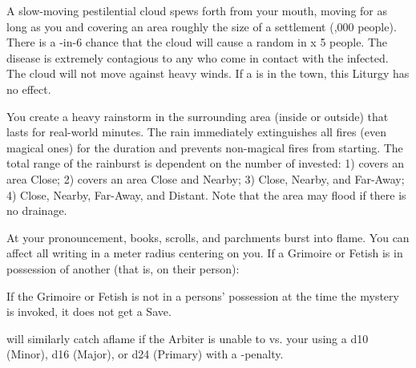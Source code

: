 \begin{multicols*}{2}
A slow-moving pestilential cloud spews forth from your mouth, moving for as long as you  and covering an area roughly the size of a  settlement (,000 people). There is a \DICE-in-6 chance that the cloud will cause a random  in \DICE x 5 people. The disease is extremely contagious to any who come in contact with the infected. The cloud will not move against heavy winds. If a  is in the town, this Liturgy has no effect.


\cbreak

\LITURGY [
  Name = Rainburst,
  Link = arcana-mystery-rainburst,
  Paradigm = Heathen,
  Duration = Session
]

You create a heavy rainstorm in the surrounding area (inside or outside) that lasts for \SUMDICE real-world minutes.  The rain immediately extinguishes all fires (even magical ones) for the duration and prevents non-magical fires from starting. The total range of the rainburst is dependent on the number of \DICE invested: 1) covers an area Close; 2) covers an area Close and Nearby; 3) Close, Nearby, and Far-Away; 4) Close, Nearby, Far-Away, and Distant. Note that the area may flood if there is no drainage.

\LITURGY [
  Name = Satanic Verses,
  Link = arcana-mystery-satanic-verses,
  Paradigm = Righteous,
  Duration = Instant
]

At your pronouncement, books, scrolls, and parchments burst into flame.  You can affect all writing in a \DICE meter radius centering on you.  If a Grimoire or Fetish is in possession of another (that is, on their person):


If the Grimoire or Fetish is not in a persons' possession at the time the mystery is invoked, it does not get a Save.

 will similarly catch aflame if the Arbiter is unable to \RB vs. your \FOC using a d10 (Minor), d16 (Major), or d24 (Primary) with a -\DICE penalty.


\end{multicols*}
